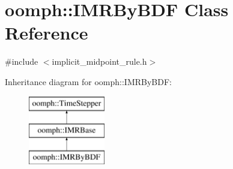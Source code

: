\hypertarget{classoomph_1_1IMRByBDF}{}\section{oomph\+:\+:I\+M\+R\+By\+B\+DF Class Reference}
\label{classoomph_1_1IMRByBDF}


{\ttfamily \#include $<$implicit\+\_\+midpoint\+\_\+rule.\+h$>$}

Inheritance diagram for oomph\+:\+:I\+M\+R\+By\+B\+DF\+:\begin{figure}[H]
\begin{center}
\leavevmode
\includegraphics[height=3.000000cm]{classoomph_1_1IMRByBDF}
\end{center}
\end{figure}
